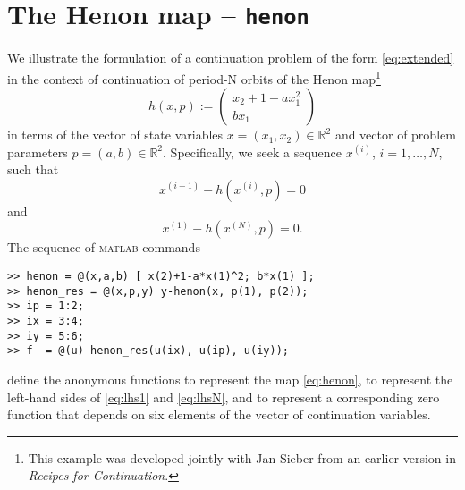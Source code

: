 \section{The Henon map -- \texttt{henon}}
We illustrate the formulation of a continuation problem of the form \eqref{eq:extended} in the context of continuation of period-N orbits of the Henon map\footnote{This example was developed jointly with Jan Sieber from an earlier version in \emph{Recipes for Continuation}.}
\begin{equation}
\label{eq:henon}
h(x,p):=\left(\begin{array}{c}x_2+1-ax_1^2\\bx_1\end{array}\right)
\end{equation}
in terms of the vector of state variables $x=(x_1,x_2)\in\mathbb{R}^2$ and vector of problem parameters $p=(a,b)\in\mathbb{R}^2$. Specifically, we seek a sequence $x^{(i)}$, $i=1,\ldots,N$, such that
\begin{equation}
\label{eq:lhs1}
x^{(i+1)}-h(x^{(i)},p)=0
\end{equation}
and
\begin{equation}
\label{eq:lhsN}
x^{(1)}-h(x^{(N)},p)=0.
\end{equation}
The sequence of \textsc{matlab} commands
\begin{lstlisting}[language=coco-highlight]
>> henon = @(x,a,b) [ x(2)+1-a*x(1)^2; b*x(1) ];
>> henon_res = @(x,p,y) y-henon(x, p(1), p(2));
>> ip = 1:2;
>> ix = 3:4;
>> iy = 5:6;
>> f  = @(u) henon_res(u(ix), u(ip), u(iy));
\end{lstlisting}
define the anonymous functions  to represent the map \eqref{eq:henon},  to represent the left-hand sides of \eqref{eq:lhs1} and \eqref{eq:lhsN}, and  to represent a corresponding zero function that depends on six elements of the vector of continuation variables. 

